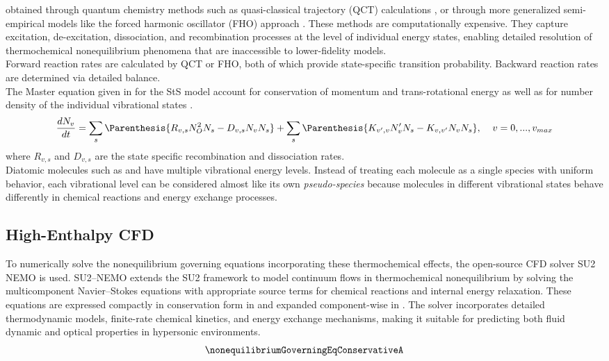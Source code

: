 obtained through quantum chemistry methods such as quasi-classical trajectory
(\gls{QCT}) calculations \cite{Andrienko2017,Chaudhry2019}, or through more
generalized semi-empirical models like the forced harmonic oscillator
(\gls{FHO}) approach \cite{Adamovich1998a}. These methods are computationally
expensive. They capture excitation, de-excitation, dissociation, and
recombination processes at the level of individual energy states, enabling
detailed resolution of thermochemical nonequilibrium phenomena that are
inaccessible to lower-fidelity models.\\

Forward reaction rates are calculated by \gls{QCT} or \gls{FHO}, both of which
provide state-specific transition probability. Backward reaction rates are
determined via detailed balance.\\ 

The Master equation given in  for the \gls{StS} model account for conservation of
momentum and trans-rotational energy as well as for number density of the
individual vibrational states \cite{Kim2013}.
\begin{equation}\label{eq:masterEquation}
\frac{dN_v}{dt} = \sum_s\Parenthesis{ R_{v,s}N^2_ON_s - D_{v,s}N_vN_s} +
    \sum_s\Parenthesis{K_{v^{\prime}, v} N^{\prime}_{v}N_s -
    K_{v,v^{\prime}}N_vN_s  }, \;\;\;\; v = 0, ..., v_{max}
\end{equation}
where $R_{v,s}$ and $D_{v,s}$ are the state specific recombination and
dissociation rates. \\

Diatomic molecules such as  and  have multiple vibrational energy
levels. Instead of treating each molecule as a single species with uniform
behavior, each vibrational level can be considered almost like its own
\textit{pseudo-species} because molecules in different vibrational states
behave differently in chemical reactions and energy exchange processes.

\subsection{High-Enthalpy \gls{CFD}}
To numerically solve the nonequilibrium governing equations incorporating these
thermochemical effects, the open-source \gls{CFD} solver \Gls{SU2} \Gls{NEMO}
\cite{Maier2021,Maier2023a} is used. \Gls{SU2}--\Gls{NEMO} extends the \Gls{SU2}
framework to model continuum flows in thermochemical nonequilibrium by solving
the multicomponent Navier–Stokes equations with appropriate source terms for
chemical reactions and internal energy relaxation. These equations are
expressed compactly in conservation form in
 and expanded component-wise in
. The solver incorporates
detailed thermodynamic models, finite-rate chemical kinetics, and energy
exchange mechanisms, making it suitable for predicting both fluid dynamic and
optical properties in hypersonic environments. 
\begin{equation}\label{eq:nonequilibriumGoverningEqConservativeA}
    \nonequilibriumGoverningEqConservativeA
\end{equation}

